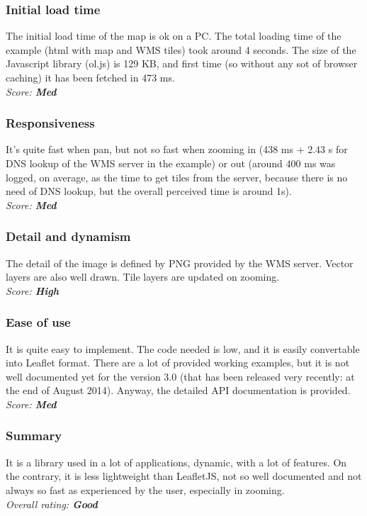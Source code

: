 \documentclass[11pt,a4paper,titlepage,oneside]{report}
\begin{document}
  \subsubsection{Initial load time}
  The initial load time of the map is ok on a PC. The total loading time of the example (html with map and WMS tiles) took around 4 seconds. The size of the Javascript library (ol.js) is 129 KB, and first time (so without any sot of browser caching) it has been fetched in 473 ms.
  \\ \emph{Score: \textbf{Med}}
  \subsubsection{Responsiveness}
  It's quite fast when pan, but not so fast when zooming in (438 ms + 2.43 s for DNS lookup of the WMS server in the example) or out (around 400 ms was logged, on average, as the time to get tiles from the server, because there is no need of DNS lookup, but the overall perceived time is around 1s).
  \\ \emph{Score: \textbf{Med}}
  \subsubsection{Detail and dynamism}
  The detail of the image is defined by PNG provided by the WMS server. Vector layers are also well drawn. Tile layers are updated on zooming.
  \\ \emph{Score: \textbf{High}}
  \subsubsection{Ease of use}
  It is quite easy to implement. The code needed is low, and it is easily convertable into Leaflet format. There are a lot of provided working examples, but it is not well documented yet for the version 3.0 (that has been released very recently: at the end of August 2014). Anyway, the detailed API documentation is provided.
  \\ \emph{Score: \textbf{Med}}
  \subsubsection{Summary}
  It is a library used in a lot of applications, dynamic, with a lot of features. On the contrary, it is less lightweight than LeafletJS, not so well documented and not always so fast as experienced by the user, especially in zooming.
  \\ \emph{Overall rating: \textbf{Good}}
\end{document}
